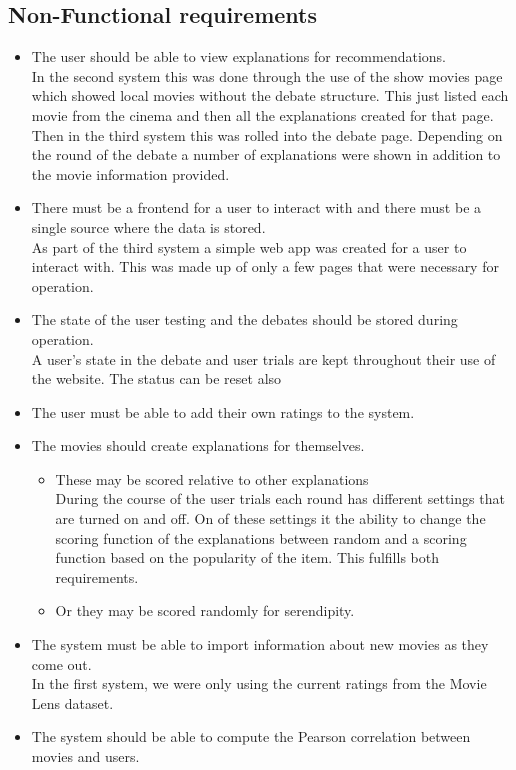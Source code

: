         \subsection{Non-Functional requirements}
            \begin{itemize}
            \item The user should be able to view explanations for recommendations.\\
                In the second system this was done through the use of the show movies page which showed local movies without the debate structure. This just listed each movie from the cinema and then all the explanations created for that page. Then in the third system this was rolled into the debate page. Depending on the round of the debate a number of explanations were shown in addition to the movie information provided. 

            \item There must be a frontend for a user to interact with and there must be a single source where the data is stored.\\
                As part of the third system a simple web app was created for a user to interact with. This was made up of only a few pages that were necessary for operation. 
            \item The state of the user testing and the debates should be stored during operation.\\
                A user's state in the debate and user trials are kept throughout their use of the website. The status can be reset also
            \item The user must be able to add their own ratings to the system.
            \item The movies should create explanations for themselves. 
                \begin{itemize}
                    \item These may be scored relative to other explanations\\
                    During the course of the user trials each round has different settings that are turned on and off. On of these settings it the ability to change the scoring function of the explanations between random and a scoring function based on the popularity of the item. This fulfills both requirements.
                    \item Or they may be scored randomly for serendipity.
                \end{itemize}

            \item The system must be able to import information about new movies as they come out.\\
            In the first system, we were only using the current ratings from the Movie Lens dataset. 
            \item The system should be able to compute the Pearson correlation between movies and users. 
            \end{itemize}

